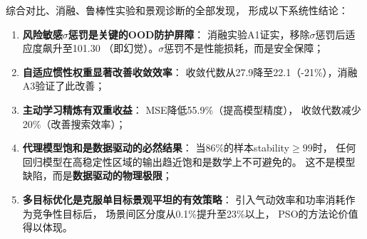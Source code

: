综合对比、消融、鲁棒性实验和景观诊断的全部发现，
形成以下系统性结论：

\begin{enumerate}
    \item \textbf{风险敏感$\sigma$惩罚是关键的OOD防护屏障}：
        消融实验A1证实，移除$\sigma$惩罚后适应度飙升至101.30
        （即幻觉）。$\sigma$惩罚不是性能损耗，而是安全保障；
    \item \textbf{自适应惯性权重显著改善收敛效率}：
        收敛代数从27.9降至22.1（-21\%），消融A3验证了此改善；
    \item \textbf{主动学习精炼有双重收益}：
        MSE降低55.9\%（提高模型精度），
        收敛代数减少20\%（改善搜索效率）；
    \item \textbf{代理模型饱和是数据驱动的必然结果}：
        当86\%的样本stability$\geq 99$时，
        任何回归模型在高稳定性区域的输出趋近饱和是数学上不可避免的。
        这不是模型缺陷，而是\textbf{数据驱动的物理极限}；
    \item \textbf{多目标优化是克服单目标景观平坦的有效策略}：
        引入气动效率和功率消耗作为竞争性目标后，
        场景间区分度从0.1\%提升至23\%以上，
        PSO的方法论价值得以体现。
\end{enumerate}
